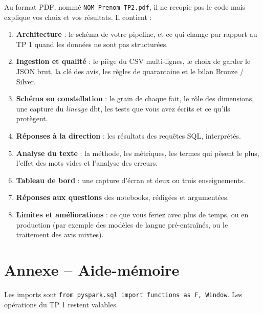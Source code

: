 \documentclass[11pt,a4paper]{article}
\newcommand{\cmd}[1]{\texttt{#1}}
\begin{document}
Au format PDF, nommé \cmd{NOM\_Prenom\_TP2.pdf}, il ne recopie pas le code mais explique vos choix
et vos résultats. Il contient :
\begin{enumerate}[leftmargin=*,itemsep=2pt]
  \item \textbf{Architecture} : le schéma de votre pipeline, et ce qui change par rapport au TP 1
        quand les données ne sont pas structurées.
  \item \textbf{Ingestion et qualité} : le piège du CSV multi-lignes, le choix de garder le JSON brut,
        la clé des avis, les règles de quarantaine et le bilan Bronze / Silver.
  \item \textbf{Schéma en constellation} : le grain de chaque fait, le rôle des dimensions, une capture du
        \emph{lineage} dbt, les tests que vous avez écrits et ce qu'ils protègent.
  \item \textbf{Réponses à la direction} : les résultats des requêtes SQL, interprétés.
  \item \textbf{Analyse du texte} : la méthode, les métriques, les termes qui pèsent le plus, l'effet
        des mots vides et l'analyse des erreurs.
  \item \textbf{Tableau de bord} : une capture d'écran et deux ou trois enseignements.
  \item \textbf{Réponses aux questions} des notebooks, rédigées et argumentées.
  \item \textbf{Limites et améliorations} : ce que vous feriez avec plus de temps, ou en production
        (par exemple des modèles de langue pré-entraînés, ou le traitement des avis mixtes).
\end{enumerate}

\clearpage
\section*{Annexe -- Aide-mémoire}\label{sec:aidememoire}

Les imports sont \cmd{from pyspark.sql import functions as F, Window}. Les opérations du TP 1 restent valables.
\end{document}
